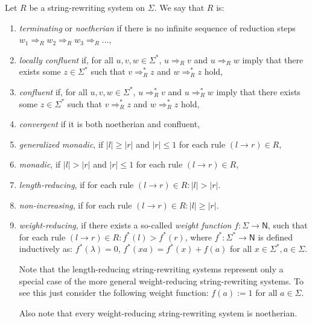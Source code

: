 \begin{definition}
Let $R$ be a string-rewriting system on $\Sigma$. We say that $R$ is:
\begin{enumerate}
\item {}\emph{terminating} or \emph{noetherian} if there is no infinite sequence of reduction steps $w_1 \Rightarrow_R w_2 \Rightarrow_R w_3 \Rightarrow_R \ldots$,
\item {}\emph{locally confluent} if, for all $u, v, w \in \Sigma^*$, $u \Rightarrow_R v$ and $u \Rightarrow_R w$ imply that there exists some $z \in \Sigma^*$ such that $v \Rightarrow_R^* z$ and $w \Rightarrow_R^* z$ hold,
\item {}\emph{confluent} if, for all $u, v, w \in \Sigma^*$, $u \Rightarrow_R^* v$ and $u \Rightarrow_R^* w$ imply that there exists some $z \in \Sigma^*$ such that $v \Rightarrow_R^* z$ and $w \Rightarrow_R^* z$ hold,
\item {}\emph{convergent} if it is both noetherian and confluent,
\item {}\emph{generalized monadic}, if $|l| \ge |r|$ and $|r|\le 1$ for each rule $(l \to r)\in R$,
\item {}\emph{monadic}, if $|l| > |r|$ and $|r|\le 1$ for each rule $(l \to r)\in R$,
\item {}\emph{length-reducing}, if for each rule $(l \to r) \in R: |l| > |r|$.
\item {}\emph{non-increasing}, if for each rule $(l \to r) \in R: |l| \ge |r|$.
\item {}\emph{weight-reducing}, if there exists a so-called \emph{weight function} $f: \Sigma \to \mathsf{N}$, such that for each rule $(l \to r) \in R: f^*(l) > f^*(r)$, where $f^*: \Sigma^* \to \mathsf{N}$ is defined inductively as: $f^*(\lambda) = 0$, $f^*(xa) = f^*(x) + f(a)$ for all $x \in \Sigma^*, a \in \Sigma$.

Note that the length-reducing string-rewriting systems represent only a special case of the more general weight-reducing string-rewriting systems. To see this just consider the following weight function: $f(a) := 1$ for all $a \in \Sigma$.

Also note that every weight-reducing string-rewriting system is noetherian.
\end{enumerate}
\end{definition}

